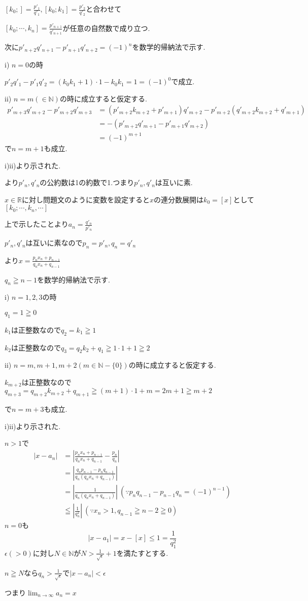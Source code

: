 \documentclass{jsarticle}
\begin{document}
$[k_0;]=\frac{p'_1}{q'_1},[k_0;k_1]=\frac{p'_2}{q'_2}$と合わせて

$[k_0;\cdots ,k_n]=\frac{p'_{n+1}}{q'_{n+1}}$が任意の自然数で成り立つ.

次に$p'_{n+2}q'_{n+1}-p'_{n+1}q'_{n+2}=(-1)^n$を数学的帰納法で示す.

i) $n=0$の時

$p'_2q'_1-p'_1q'_2=(k_0k_1+1)\cdot 1-k_0k_1=1=(-1)^0$で成立.

ii) $n=m(\in \mathbb{N})$の時に成立すると仮定する.
\begin{align*}
p'_{m+3}q'_{m+2}-p'_{m+2}q'_{m+3}&=(p'_{m+2}k_{m+2}+p'_{m+1})q'_{m+2}-p'_{m+2}(q'_{m+2}k_{m+2}+q'_{m+1})\\
&=-(p'_{m+2}q'_{m+1}-p'_{m+1}q'_{m+2})\\
&=(-1)^{m+1}
\end{align*}
で$n=m+1$も成立.

i)ii)より示された.

より$p'_n,q'_n$の公約数は1の約数で1.つまり$p'_n,q'_n$は互いに素.

$x\in \mathbb{R}$に対し問題文のように変数を設定すると$x$の連分数展開は$k_0=[x]$として$[k_0;\cdots,k_n,\cdots]$

上で示したことより$a_n=\frac{q'_n}{p'_n}$

$p'_n,q'_n$は互いに素なので$p_n=p'_n,q_n=q'_n$

より$x=\frac{p_nx_n+p_{n-1}}{q_nx_n+q_{n-1}}$

$q_n \geqq n-1$を数学的帰納法で示す.

i) $n=1,2,3$の時

$q_1=1\geqq 0$

$k_1$は正整数なので$q_2=k_1\geqq 1$

$k_2$は正整数なので$q_3=q_2k_2+q_1\geqq 1\cdot 1 + 1 \geqq 2$

ii) $n=m,m+1,m+2 (m\in \mathbb{N}-\{0\})$の時に成立すると仮定する.

$k_{m+2}$は正整数なので$q_{m+3}=q_{m+2}k_{m+2}+q_{m+1} \geqq (m+1)\cdot 1 +m = 2m+1 \geqq m+2 $

で$n=m+3$も成立.

i)ii)より示された.

$n > 1$で
\begin{align*}
|x-a_n| &= |\frac{p_nx_n+p_{n-1}}{q_nx_n+q_{n-1}}-\frac{p_n}{q_n}|\\
&=|\frac{q_np_{n-1}-p_nq_{n-1}}{q_n(q_nx_n+q_{n-1})}|\\
&= |\frac{1}{q_n(q_nx_n+q_{n-1})}| \ (\because p_nq_{n-1}-p_{n-1}q_n=(-1)^{n-1})\\
&\leqq |\frac{1}{q_n^2}| \ (\because x_n >1 ,q_{n-1}\geqq n-2\geqq 0) 
\end{align*}
$n=0$も
\[|x-a_1|=x-[x]\leq 1=\frac{1}{q_1^2}\]
$\epsilon(>0)$に対し$N\in\mathbb{N}$が$N>\frac{1}{\sqrt{\epsilon}}+1$を満たすとする.

$n\geqq N$なら$q_n > \frac{1}{\sqrt{\epsilon}}$で$|x-a_n|<\epsilon$

つまり$\displaystyle\lim_{n\to \infty}a_n=x$
\end{document}
